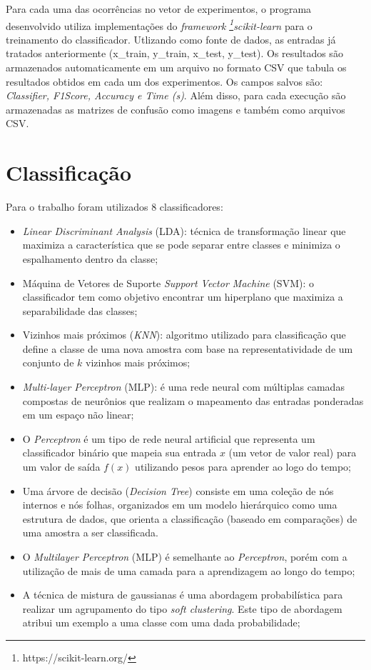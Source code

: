 \documentclass[conference]{IEEEtran}
\begin{document}
Para cada uma das ocorrências no vetor de experimentos, o programa desenvolvido utiliza implementações do \textit{framework} \textit{\footnote{https://scikit-learn.org/}scikit-learn} para o treinamento do classificador. Utlizando como fonte de dados, as entradas já tratados anteriormente (x\_train, y\_train, x\_test, y\_test). Os resultados são armazenados automaticamente em um arquivo no formato CSV que tabula os resultados obtidos em cada um dos experimentos. Os campos salvos são: \textit{Classifier, F1Score, Accuracy e Time (s)}. Além disso, para cada execução são armazenadas as matrizes de confusão como imagens e também como arquivos CSV.

\section{Classificação}

Para o trabalho foram utilizados 8 classificadores:

\begin{itemize}
    \item \textit{Linear Discriminant Analysis} (LDA): técnica de transformação linear que maximiza a característica que se pode separar entre classes e minimiza o espalhamento dentro da classe; \cite{Andrew:Statistical}
    \item Máquina de Vetores de Suporte \textit{Support Vector Machine} (SVM): o classificador tem como objetivo encontrar um hiperplano que maximiza a separabilidade das classes; \cite{Andrew:Statistical}
    \item Vizinhos mais próximos (\textit{KNN}): algoritmo utilizado para classificação que define a classe de uma nova amostra com base na representatividade de um conjunto de $k$ vizinhos mais próximos; \cite{Duda:Pattern}
    \item \textit{Multi-layer Perceptron} (MLP): é uma rede neural com múltiplas camadas compostas de neurônios que realizam o mapeamento das entradas ponderadas em um espaço não linear; \cite{Andrew:Statistical}
    \item O \textit{Perceptron} é um tipo de rede neural artificial que representa um classificador binário que mapeia sua entrada $x$ (um vetor de valor real) para um valor de saída $f(x)$ utilizando pesos para aprender ao logo do tempo; \cite{Rosenblatt1958ThePA}
    \item Uma árvore de decisão (\textit{Decision Tree}) consiste em uma coleção de nós internos e nós folhas, organizados em um modelo hierárquico como uma estrutura de dados, que orienta a classificação (baseado em comparações) de uma amostra a ser classificada. \cite{Duda:Pattern}
    \item O \textit{Multilayer Perceptron} (MLP) é semelhante ao \textit{Perceptron}, porém com a utilização de mais de uma camada para a aprendizagem ao longo do tempo;
    \item A técnica de mistura de gaussianas é uma abordagem probabilística para realizar um agrupamento do tipo \textit{soft clustering}. Este tipo de abordagem atribui um exemplo a uma classe com uma dada probabilidade; \cite{Pinkus99approximationtheory}
\end{itemize}
\end{document}
